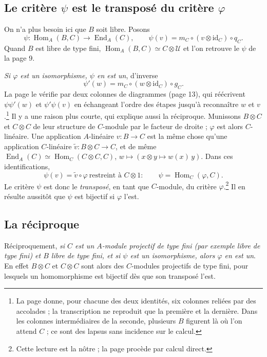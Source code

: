 \documentclass[11pt,a4paper]{article}
\begin{document}
\subsection*{Le critère $\psi$ est le transposé du critère $\varphi$}

On n'a plus besoin ici que $B$ soit libre. Posons
\[
\psi \colon \operatorname{Hom}_A(B, C) \longrightarrow \operatorname{End}_A(C),
\qquad
\psi(v) = m_C \circ (v \otimes \mathrm{id}_C) \circ q_C .
\]
Quand $B$ est libre de type fini, $\operatorname{Hom}_A(B, C) \simeq C
\otimes \mathcal{U}$ et l'on retrouve le $\psi$ de la page 9.

\emph{Si $\varphi$ est un isomorphisme, $\psi$ en est un}, d'inverse
\[
\psi'(w) = m_C \circ (w \otimes \mathrm{id}_C) \circ g_C .
\]
La page le vérifie par deux colonnes de diagrammes (page 13), qui réécrivent
$\psi\psi'(w)$ et $\psi'\psi(v)$ en échangeant l'ordre des étapes jusqu'à
reconnaître $w$ et $v$.\footnote{La page donne, pour chacune des deux
identités, six colonnes reliées par des accolades ; la transcription ne
reproduit que la première et la dernière. Dans les colonnes intermédiaires de
la seconde, plusieurs $B$ figurent là où l'on attend $C$ ; ce sont des
lapsus sans incidence sur le calcul.} Il y a une raison plus courte, qui
explique aussi la réciproque. Munissons $B \otimes C$ et $C \otimes C$ de
leur structure de $C$-module par le facteur de droite ; $\varphi$ est alors
$C$-linéaire. Une application $A$-linéaire $v \colon B \to C$ est la même
chose qu'une application $C$-linéaire $\tilde v \colon B \otimes C \to C$,
et de même $\operatorname{End}_A(C) \simeq \operatorname{Hom}_C(C \otimes C,
C)$, $w \mapsto (x \otimes y \mapsto w(x)\,y)$. Dans ces identifications,
\[
\psi(v) = \tilde v \circ \varphi \ \text{restreint à } C \otimes 1 :
\qquad \psi = \operatorname{Hom}_C(\varphi, C).
\]
Le critère $\psi$ est donc le \emph{transposé}, en tant que $C$-module, du
critère $\varphi$.\footnote{Cette lecture est la nôtre ; la page procède par
calcul direct.} Il en résulte aussitôt que $\psi$ est bijectif si $\varphi$
l'est.

\subsection*{La réciproque}

Réciproquement, \emph{si $C$ est un $A$-module projectif de type fini (par
exemple libre de type fini) et $B$ libre de type fini, et si $\psi$ est un
isomorphisme, alors $\varphi$ en est un}. En effet $B \otimes C$ et
$C \otimes C$ sont alors des $C$-modules projectifs de type fini, pour
lesquels un homomorphisme est bijectif dès que son transposé l'est.
\end{document}

